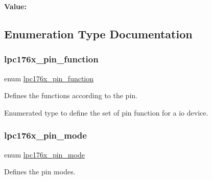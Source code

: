 {\bfseries Value\+:}
\begin{DoxyCode}{0}
\DoxyCodeLine{[ mod ] = \{                                       \(\backslash\)}
\DoxyCodeLine{  \}}

\end{DoxyCode}


\subsection{Enumeration Type Documentation}
\mbox{\label{io-defs_8h_a93321e597449441e81f45118a89a304e}} 
\subsubsection{\texorpdfstring{lpc176x\_pin\_function}{lpc176x\_pin\_function}}
{\footnotesize\ttfamily enum \mbox{\hyperlink{io-defs_8h_a93321e597449441e81f45118a89a304e}{lpc176x\+\_\+pin\+\_\+function}}}



Defines the functions according to the pin. 

Enumerated type to define the set of pin function for a io device. \mbox{\label{io-defs_8h_a9390c5b28191c22aaca678d89b1189ec}} 
\subsubsection{\texorpdfstring{lpc176x\_pin\_mode}{lpc176x\_pin\_mode}}
{\footnotesize\ttfamily enum \mbox{\hyperlink{io-defs_8h_a9390c5b28191c22aaca678d89b1189ec}{lpc176x\+\_\+pin\+\_\+mode}}}



Defines the pin modes. 

\mbox{\label{io-defs_8h_a7591f1cf553f174941b6ebaeb85d5970}} 
